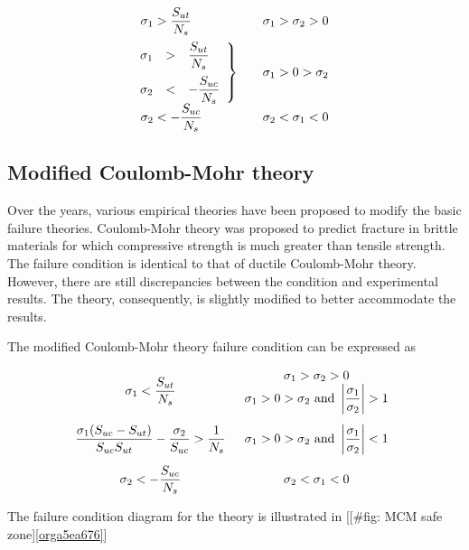\documentclass[a4paper,openany,12pt]{book}
\begin{document}
$$\begin{array}{l l l}
  \sigma_1 > \dfrac{S_{ut}}{N_s} & & \sigma_1 > \sigma_2 > 0 \\[10pt]
  \left. \hspace{-0.23cm}
  \begin{array}{l l l}
    \sigma_1 & > & \dfrac{S_{ut}}{N_s} \\[10pt]
    \sigma_2 & < & -\dfrac{S_{uc}}{N_s}
    \end{array} \right\} & & \sigma_1 > 0 > \sigma_2 \\[10pt]
    \sigma_2 <  - \dfrac{S_{uc}}{N_s} & & \sigma _2 < \sigma _1 < 0
  \end{array}$$

\subsection{Modified Coulomb-Mohr theory}
\label{sec:orgab50560}
Over the years, various empirical theories have been proposed to modify
the basic failure theories. Coulomb-Mohr theory was proposed to predict
fracture in brittle materials for which compressive strength is much
greater than tensile strength. The failure condition is identical to
that of ductile Coulomb-Mohr theory. However, there are still
discrepancies between the condition and experimental results. The
theory, consequently, is slightly modified to better accommodate the
results.

The modified Coulomb-Mohr theory failure condition can be expressed as

$$\begin{array}{c c}
    \sigma_1 < \dfrac{S_{ut}}{N_s} &
      \begin{array}{c}
        \sigma_1 > \sigma_2 > 0 \\ 
        \sigma_1 > 0 > \sigma_2 \text{ and } \left| \dfrac{\sigma_1}{\sigma_2} \right| > 1 
      \end{array} \\[20pt]
    \dfrac{\sigma_1(S_{uc} - S_{ut})}{S_{uc}S_{ut}} - \dfrac{\sigma_2}{S_{uc}} >
      \dfrac{1}{N_s} & \sigma_1 > 0 > \sigma_2\text{ and }\left| \dfrac{\sigma_1}{\sigma_2} \right| < 1 \\[15pt]
    \sigma_2 <  -\dfrac{S_{uc}}{N_s} & \sigma_2 < \sigma_1 < 0 
  \end{array}$$

The failure condition diagram for the theory is illustrated in
[[\#fig: MCM safe zone]\ref{orga5ea676}]
\end{document}
